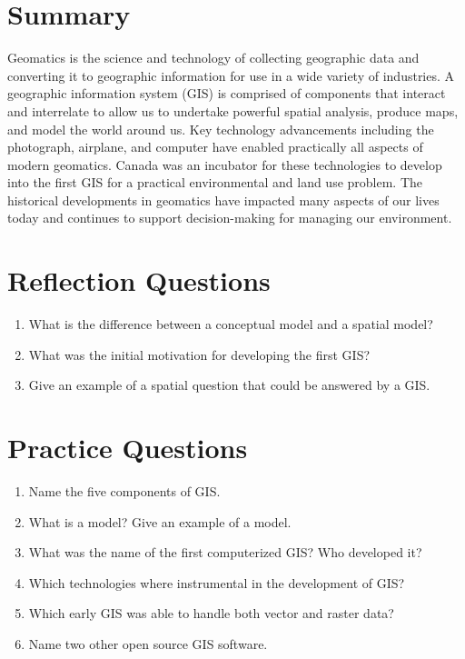 \documentclass[
]{book}
\providecommand{\tightlist}{%
  \setlength{\itemsep}{0pt}\setlength{\parskip}{0pt}}
\begin{document}
\hypertarget{summary}{%
\section{Summary}\label{summary}}

Geomatics is the science and technology of collecting geographic data and converting it to geographic information for use in a wide variety of industries. A geographic information system (GIS) is comprised of components that interact and interrelate to allow us to undertake powerful spatial analysis, produce maps, and model the world around us. Key technology advancements including the photograph, airplane, and computer have enabled practically all aspects of modern geomatics. Canada was an incubator for these technologies to develop into the first GIS for a practical environmental and land use problem. The historical developments in geomatics have impacted many aspects of our lives today and continues to support decision-making for managing our environment.

\hypertarget{reflection-questions}{%
\section*{Reflection Questions}\label{reflection-questions}}

\begin{enumerate}
\def\labelenumi{\arabic{enumi}.}
\tightlist
\item
  What is the difference between a conceptual model and a spatial model?
\item
  What was the initial motivation for developing the first GIS?
\item
  Give an example of a spatial question that could be answered by a GIS.
\end{enumerate}

\hypertarget{practice-questions}{%
\section*{Practice Questions}\label{practice-questions}}

\begin{enumerate}
\def\labelenumi{\arabic{enumi}.}
\tightlist
\item
  Name the five components of GIS.
\item
  What is a model? Give an example of a model.
\item
  What was the name of the first computerized GIS? Who developed it?
\item
  Which technologies where instrumental in the development of GIS?
\item
  Which early GIS was able to handle both vector and raster data?
\item
  Name two other open source GIS software.
\end{enumerate}
\end{document}

